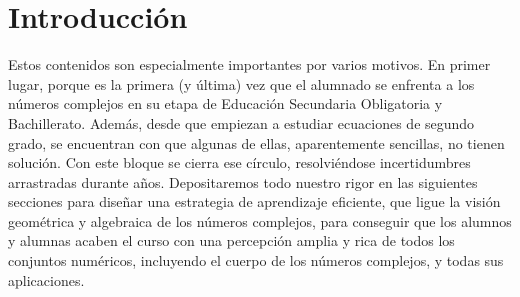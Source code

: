 \documentclass[../main.tex]{memoir}
\begin{document}
\chapter{Introducción}


Estos contenidos son especialmente importantes por varios motivos. En primer lugar, porque es la primera (y última) vez que el alumnado se enfrenta a los números complejos en su etapa de Educación Secundaria Obligatoria y Bachillerato. Además, desde que empiezan a estudiar ecuaciones de segundo grado, se encuentran con que algunas de ellas, aparentemente sencillas, no tienen solución. Con este bloque se cierra ese círculo, resolviéndose incertidumbres arrastradas durante años. Depositaremos todo nuestro rigor en las siguientes secciones para diseñar una estrategia de aprendizaje eficiente, que ligue la visión geométrica y algebraica de los números complejos, para conseguir que los alumnos y alumnas acaben el curso con una percepción amplia y rica de todos los conjuntos numéricos, incluyendo el cuerpo de los números complejos, y todas sus aplicaciones.
\end{document}
